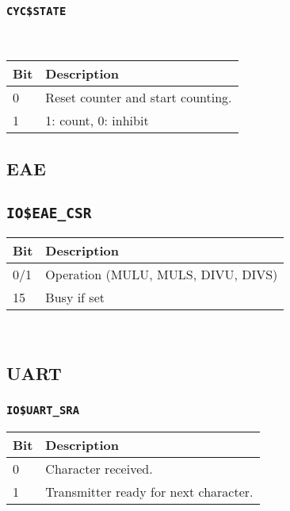 \documentclass{leaflet}
\begin{document}
    \subsubsection{\texttt{CYC\$STATE}}
~\vspace*{-3mm}
     \begin{center}
{\scriptsize
      \begin{longtable}{|l|l|}
       \hline
        Bit&Description\\
       \hline
       \hline
        0&Reset counter and start counting.\\
        1&1: count, 0: inhibit\\
       \hline
      \end{longtable}
}
     \end{center}
     \vspace*{-14mm}
%
  \subsection{EAE}
   \subsection{\texttt{IO\$EAE\_CSR}}
    \begin{center}
{\scriptsize
     \begin{longtable}{|l|l|}
      \hline
       Bit&Description\\
      \hline
      \hline
       0/1&Operation (MULU, MULS, DIVU, DIVS)\\
       15&Busy if set\\
      \hline
     \end{longtable}
}
    \end{center}
%
~\vspace*{-20mm}
  \subsection{UART}
   \subsubsection{\texttt{IO\$UART\_SRA}}
    \begin{center}
{\scriptsize
     \begin{longtable}{|l|l|}
      \hline
       Bit&Description\\
      \hline
      \hline
       0&Character received.\\
       1&Transmitter ready for next character.\\
      \hline
     \end{longtable}
}
    \end{center}
    \vspace*{-16mm}
%
\end{document}
